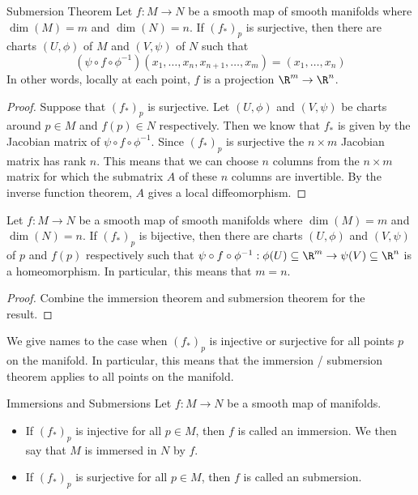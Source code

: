\documentclass[a4paper]{article}
\begin{document}
\begin{thm}{Submersion Theorem}{} Let $f:M\to N$ be a smooth map of smooth manifolds where $\dim(M)=m$ and $\dim(N)=n$. If $(f_\ast)_p$ is surjective, then there are charts $(U,\phi)$ of $M$ and $(V,\psi)$ of $N$ such that $$(\psi\circ f\circ\phi^{-1})(x_1,\dots,x_n,x_{n+1},\dots,x_m)=(x_1,\dots,x_n)$$ In other words, locally at each point, $f$ is a projection $\R^m\to\R^n$. 
\begin{proof}
Suppose that $(f_\ast)_p$ is surjective. Let $(U,\phi)$ and $(V,\psi)$ be charts around $p\in M$ and $f(p)\in N$ respectively. Then we know that $f_\ast$ is given by the Jacobian matrix of $\psi\circ f\circ\phi^{-1}$. Since $(f_\ast)_p$ is surjective the $n\times m$ Jacobian matrix has rank $n$. This means that we can choose $n$ columns from the $n\times m$ matrix for which the submatrix $A$ of these $n$ columns are invertible. By the inverse function theorem, $A$ gives a local diffeomorphism. 
\end{proof}
\end{thm}

\begin{crl}{}{} Let $f:M\to N$ be a smooth map of smooth manifolds where $\dim(M)=m$ and $\dim(N)=n$. If $(f_\ast)_p$ is bijective, then there are charts $(U,\phi)$ and $(V,\psi)$ of $p$ and $f(p)$ respectively such that $\psi\circ f\circ\phi^{-1}:\phi(U)\subseteq\R^m\to\psi(V)\subseteq\R^n$ is a homeomorphism. In particular, this means that $m=n$. 
\begin{proof}
Combine the immersion theorem and submersion theorem for the result. 
\end{proof}
\end{crl}

We give names to the case when $(f_\ast)_p$ is injective or surjective for all points $p$ on the manifold. In particular, this means that the immersion / submersion theorem applies to all points on the manifold. 

\begin{defn}{Immersions and Submersions}{} Let $f:M\to N$ be a smooth map of manifolds. 
\begin{itemize}
\item If $(f_\ast)_p$ is injective for all $p\in M$, then $f$ is called an immersion. We then say that $M$ is immersed in $N$ by $f$. 
\item If $(f_\ast)_p$ is surjective for all $p\in M$, then $f$ is called an submersion. 
\end{itemize}
\end{defn}
\end{document}
